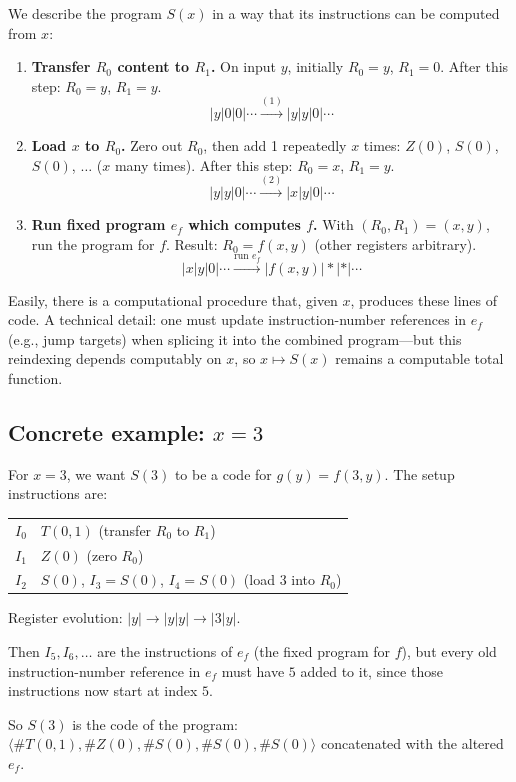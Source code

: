 \documentclass[11pt]{article}
\begin{document}
We describe the program $S(x)$ in a way that its instructions can be computed from $x$:
\begin{enumerate}[leftmargin=1.8em, label=\arabic*)]
    \item \textbf{Transfer $R_0$ content to $R_1$.} On input $y$, initially $R_0 = y$, $R_1 = 0$. After this step: $R_0 = y$, $R_1 = y$.
    \[
        |y|0|0|\cdots \xrightarrow{(1)} |y|y|0|\cdots
    \]
    \item \textbf{Load $x$ to $R_0$.} Zero out $R_0$, then add 1 repeatedly $x$ times: $Z(0)$, $S(0)$, $S(0)$, $\ldots$ ($x$ many times). After this step: $R_0 = x$, $R_1 = y$.
    \[
        |y|y|0|\cdots \xrightarrow{(2)} |x|y|0|\cdots
    \]
    \item \textbf{Run fixed program $e_f$ which computes $f$.} With $(R_0,R_1) = (x,y)$, run the program for $f$. Result: $R_0 = f(x,y)$ (other registers arbitrary).
    \[
        |x|y|0|\cdots \xrightarrow{\text{run } e_f} |f(x,y)|*|*|\cdots
    \]
\end{enumerate}
Easily, there is a computational procedure that, given $x$, produces these lines of code. A technical detail: one must update instruction-number references in $e_f$ (e.g., jump targets) when splicing it into the combined program---but this reindexing depends computably on $x$, so $x \mapsto S(x)$ remains a computable total function.

\subsection{Concrete example: $x = 3$}

For $x = 3$, we want $S(3)$ to be a code for $g(y) = f(3,y)$. The setup instructions are:
\begin{center}
\begin{tabular}{ll}
    $I_0$ & $T(0,1)$ \quad (transfer $R_0$ to $R_1$) \\
    $I_1$ & $Z(0)$ \quad (zero $R_0$) \\
    $I_2$ & $S(0)$, \quad $I_3 = S(0)$, \quad $I_4 = S(0)$ \quad (load 3 into $R_0$)
\end{tabular}
\end{center}
Register evolution: $|y| \to |y|y| \to |3|y|$.

Then $I_5, I_6, \ldots$ are the instructions of $e_f$ (the fixed program for $f$), but every old instruction-number reference in $e_f$ must have $5$ added to it, since those instructions now start at index $5$.

So $S(3)$ is the code of the program: $\langle \#T(0,1), \#Z(0), \#S(0), \#S(0), \#S(0) \rangle$ concatenated with the altered $e_f$.
\end{document}
